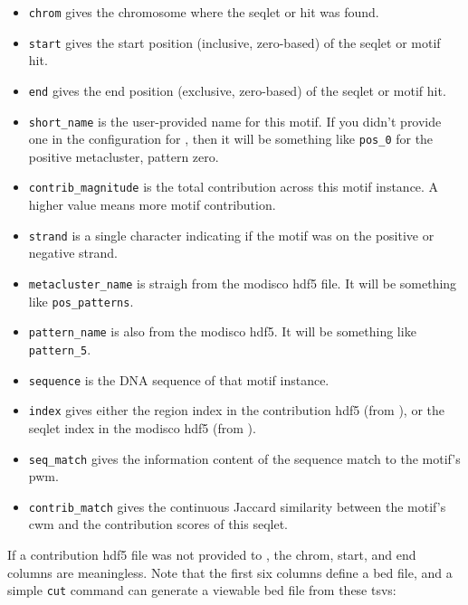 \documentclass{article}
\begin{document}
\begin{itemize}
    \item \texttt{chrom} gives the chromosome where the seqlet or hit was found.
    \item \texttt{start} gives the start position (inclusive, zero-based) of the
        seqlet or motif hit.
    \item \texttt{end} gives the end position (exclusive, zero-based) of the
        seqlet or motif hit.
    \item \begin{sloppypar}\texttt{short\_name} is the user-provided name for
            this motif.
            If you didn't provide one in the configuration for
            , then it will be something like
            \texttt{pos\_0} for the positive metacluster, pattern zero.
        \end{sloppypar}
    \item \texttt{contrib\_magnitude} is the total contribution across this
        motif instance.
        A higher value means more motif contribution.
    \item \texttt{strand} is a single character indicating if the motif was on
        the positive or negative strand.
    \item \texttt{metacluster\_name} is straigh from the modisco hdf5 file.
        It will be something like \texttt{pos\_patterns}.
    \item \texttt{pattern\_name} is also from the modisco hdf5.
        It will be something like \texttt{pattern\_5}.
    \item \texttt{sequence} is the DNA sequence of that motif instance.
    \item \texttt{index} gives either the region index in the contribution hdf5
        (from ), or the seqlet index in the modisco hdf5
        (from ).
    \item \texttt{seq\_match} gives the information content of the sequence
        match to the motif's pwm.
    \item \texttt{contrib\_match} gives the continuous Jaccard similarity
        between the motif's cwm and the contribution scores of this seqlet.
\end{itemize}


If a contribution hdf5 file was not provided to ,
the chrom, start, and end columns are meaningless.
Note that the first six columns define a bed file, and a simple \texttt{cut}
command can generate a viewable bed file from these tsvs:
\end{document}
